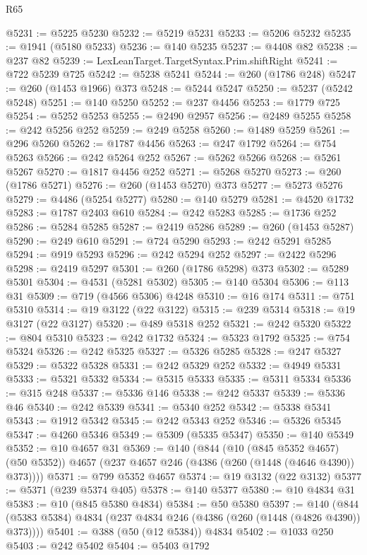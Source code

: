 \begin{lexlean}{R65}
\begin{coremodule}
{@5231 := @5225 @5230
@5232 := @5219 @5231
@5233 := @5206 @5232
@5235 := @1941 (@5180 @5233)
@5236 := @140 @5235
@5237 := @4408 @82
@5238 := @237 @82
@5239 := LexLeanTarget.TargetSyntax.Prim.shiftRight
@5241 := @722 @5239 @725
@5242 := @5238 @5241
@5244 := @260 (@1786 @248)
@5247 := @260 (@1453 @1966) @373
@5248 := @5244 @5247
@5250 := @5237 (@5242 @5248)
@5251 := @140 @5250
@5252 := @237 @4456
@5253 := @1779 @725
@5254 := @5252 @5253
@5255 := @2490 @2957
@5256 := @2489 @5255
@5258 := @242 @5256 @252
@5259 := @249 @5258
@5260 := @1489 @5259
@5261 := @296 @5260
@5262 := @1787 @4456
@5263 := @247 @1792
@5264 := @754 @5263
@5266 := @242 @5264 @252
@5267 := @5262 @5266
@5268 := @5261 @5267
@5270 := @1817 @4456 @252
@5271 := @5268 @5270
@5273 := @260 (@1786 @5271)
@5276 := @260 (@1453 @5270) @373
@5277 := @5273 @5276
@5279 := @4486 (@5254 @5277)
@5280 := @140 @5279
@5281 := @4520 @1732
@5283 := @1787 @2403 @610
@5284 := @242 @5283
@5285 := @1736 @252
@5286 := @5284 @5285
@5287 := @2419 @5286
@5289 := @260 (@1453 @5287)
@5290 := @249 @610
@5291 := @724 @5290
@5293 := @242 @5291 @5285
@5294 := @919 @5293
@5296 := @242 @5294 @252
@5297 := @2422 @5296
@5298 := @2419 @5297
@5301 := @260 (@1786 @5298) @373
@5302 := @5289 @5301
@5304 := @4531 (@5281 @5302)
@5305 := @140 @5304
@5306 := @113 @31
@5309 := @719 (@4566 @5306) @4248
@5310 := @16 @174
@5311 := @751 @5310
@5314 := @19 @3122 (@22 @3122)
@5315 := @239 @5314
@5318 := @19 @3127 (@22 @3127)
@5320 := @489 @5318 @252
@5321 := @242 @5320
@5322 := @804 @5310
@5323 := @242 @1732
@5324 := @5323 @1792
@5325 := @754 @5324
@5326 := @242 @5325
@5327 := @5326 @5285
@5328 := @247 @5327
@5329 := @5322 @5328
@5331 := @242 @5329 @252
@5332 := @4949 @5331
@5333 := @5321 @5332
@5334 := @5315 @5333
@5335 := @5311 @5334
@5336 := @315 @248
@5337 := @5336 @146
@5338 := @242 @5337
@5339 := @5336 @46
@5340 := @242 @5339
@5341 := @5340 @252
@5342 := @5338 @5341
@5343 := @1912 @5342
@5345 := @242 @5343 @252
@5346 := @5326 @5345
@5347 := @4260 @5346
@5349 := @5309 (@5335 @5347)
@5350 := @140 @5349
@5352 := @10 @4657 @31
@5369 := @140
    (@844
      (@10 (@845 @5352 @4657) (@50 @5352))
      @4657
      (@237 @4657 @246 (@4386 (@260 (@1448 (@4646 @4390)) @373))))
@5371 := @799 @5352 @4657
@5374 := @19 @3132 (@22 @3132)
@5377 := @5371 (@239 @5374 @405)
@5378 := @140 @5377
@5380 := @10 @4834 @31
@5383 := @10 (@845 @5380 @4834)
@5384 := @50 @5380
@5397 := @140 (@844 (@5383 @5384) @4834 (@237 @4834 @246 (@4386 (@260 (@1448 (@4826 @4390)) @373))))
@5401 := @388 (@50 (@12 @5384)) @4834
@5402 := @1033 @250
@5403 := @242 @5402
@5404 := @5403 @1792
}
\end{coremodule}
\end{lexlean}
